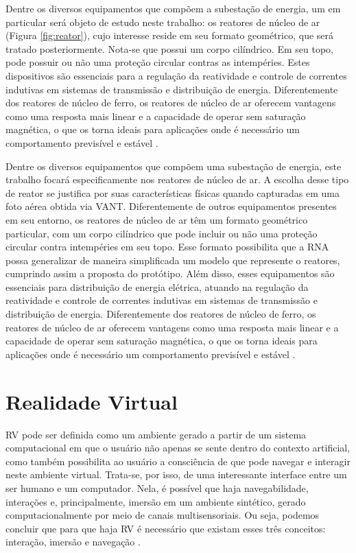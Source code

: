 Dentre os diversos equipamentos que compõem a subestação de energia, um em particular será objeto de estudo neste trabalho: os reatores de núcleo de ar (Figura \ref{fig:reator}), cujo interesse reside em seu formato geométrico, que será tratado posteriormente. Nota-se que possui um corpo cilíndrico. Em seu topo, pode possuir ou não uma proteção circular contras as intempéries. Estes dispositivos são essenciais para a regulação da reatividade e controle de correntes indutivas em sistemas de transmissão e distribuição de energia. Diferentemente dos reatores de núcleo de ferro, os reatores de núcleo de ar oferecem vantagens como uma resposta mais linear e a capacidade de operar sem saturação magnética, o que os torna ideais para aplicações onde é necessário um comportamento previsível e estável \cite{de2012reatores}. 

Dentre os diversos equipamentos que compõem uma subestação de energia, este trabalho focará especificamente nos reatores de núcleo de ar. A escolha desse tipo de reator se justifica por suas características físicas quando capturadas em uma foto aérea obtida via VANT. Diferentemente de outros equipamentos presentes em seu entorno, os reatores de núcleo de ar têm um formato geométrico particular, com um corpo cilíndrico que pode incluir ou não uma proteção circular contra intempéries em seu topo. Esse formato possibilita que a RNA possa generalizar de maneira simplificada um modelo que represente o reatores, cumprindo assim a proposta do protótipo. Além disso, esses equipamentos são essenciais para distribuição de energia elétrica, atuando na regulação da reatividade e controle de correntes indutivas em sistemas de transmissão e distribuição de energia. Diferentemente dos reatores de núcleo de ferro, os reatores de núcleo de ar oferecem vantagens como uma resposta mais linear e a capacidade de operar sem saturação magnética, o que os torna ideais para aplicações onde é necessário um comportamento previsível e estável \cite{de2012reatores}.

\section{Realidade Virtual}
\label{sec:precisaorecall}

RV pode ser definida como um ambiente gerado a partir de um sistema computacional em que o usuário não apenas se sente dentro do contexto artificial, como também possibilita ao usuário a consciência de que pode navegar e interagir neste ambiente virtual. Trata-se, por isso, de uma interessante interface entre um ser humano e um computador. Nela, é possível que haja navegabilidade, interações e, principalmente, imersão em um ambiente sintético, gerado computacionalmente por meio de canais multisensoriais. Ou seja, podemos concluir que para que haja RV é necessário que existam esses três conceitos: interação, imersão e navegação \cite{kalawsky1993science}.

